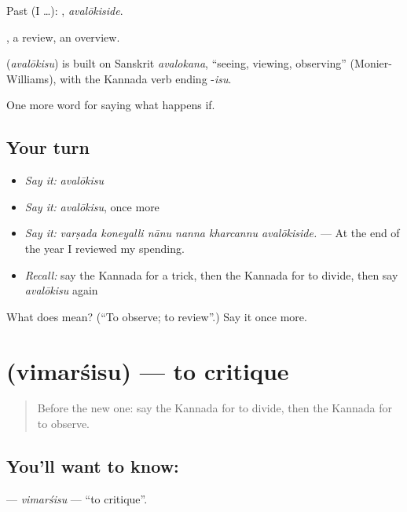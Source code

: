 Past (I …): , \emph{avalōkiside}.

, a review, an overview.

\begin{cousinweb}
\textbf{} (\emph{avalōkisu}) is built on Sanskrit \emph{avalokana}, \textquotedblleft{}seeing, viewing, observing\textquotedblright{} (Monier-Williams), with the Kannada verb ending -\emph{isu}.
\end{cousinweb}

\begin{grammarlens}[title={What you've built}]
One more word for saying what happens if.
\end{grammarlens}

\subsection*{Your turn}
\begin{itemize}
\raggedright
  \item \emph{Say it:} \emph{avalōkisu}
  \item \emph{Say it:} \emph{avalōkisu}, once more
  \item \emph{Say it:} \emph{varṣada koneyalli nānu nanna kharcannu avalōkiside.} — At the end of the year I reviewed my spending.
  \item \emph{Recall:} say the Kannada for a trick, then the Kannada for to divide, then say \emph{avalōkisu} again
\end{itemize}

\begin{tcolorbox}[breakable,colback=teal!4,colframe=teal!35!black,title={Before you move on}]
What does  mean? (\textquotedblleft{}To observe; to review\textquotedblright{}.) Say it once more.
\end{tcolorbox}
\section[\texorpdfstring{\kn{ವಿಮರ್ಶಿಸು} (vimarśisu)}{ವಿಮರ್ಶಿಸು (vimarśisu)}]{ (vimarśisu) — to critique}

\label{lesson:KA-C424-vimarsisu}



\begin{quote}
Before the new one: say the Kannada for to divide, then the Kannada for to observe.
\end{quote}

\subsection*{You'll want to know: }
\textbf{} — \emph{vimarśisu} — \textquotedblleft{}to critique\textquotedblright{}.

